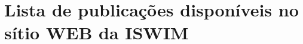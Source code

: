 \documentclass{ufscThesis}
\begin{document}


\anexo
\chapter{Lista de publicações disponíveis no sítio WEB da ISWIM}\label{anexo:index-iswim}
\end{document}
